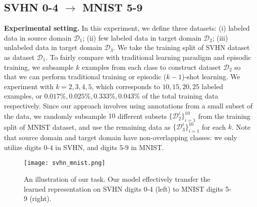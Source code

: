 

\subsection{SVHN 0-4 $\rightarrow$ MNIST 5-9}
\textbf{Experimental setting.} In this experiment, we define three datasets: (i) labeled data in source domain $\mathcal{D}_{1}$; (ii) few labeled data in target domain $\mathcal{D}_{2}$; (iii) unlabeled data in target domain $\mathcal{D}_{3}$. We take the training split of SVHN dataset as dataset $\mathcal{D}_{1}$. To fairly compare with traditional learning paradigm and episodic training, we subsample $k$ examples from each class to construct dataset $\mathcal{D}_{2}$ so that we can perform traditional training or episodic ($k-1$)-shot learning. We experiment with $k=2,3,4,5$, which corresponds to $10,15,20,25$ labeled examples, or $0.017\%,0.025\%,0.333\%,0.043\%$ of the total training data respectively. Since our approach involves using annotations from a small subset of the data, we randomly subsample $10$ different subsets $\{\mathcal{D}_{2}^{i}\}_{i=1}^{10}$ from the training split of MNIST dataset, and use the remaining data as $\{\mathcal{D}_{3}^{i}\}_{i=1}^{10}$ for each $k$. Note that source domain and target domain have non-overlapping classes: we only utilize digits $0$-$4$ in SVHN, and digits $5$-$9$ in MNIST. 

\begin{figure*}[htbp]
\centering
\texttt{[image: svhn\_mnist.png]}
\caption{An illustration of our task. Our model effectively transfer the learned representation on SVHN digits 0-4  (left) to MNIST digits 5-9 (right).} 
\label{fig:svhn_mnist}
\end{figure*}

